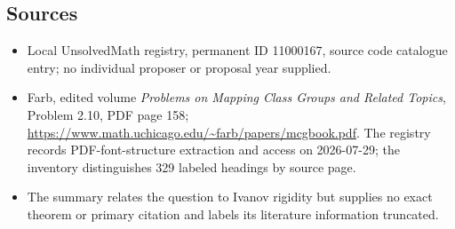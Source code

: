 \documentclass[11pt]{article}
\begin{document}
\subsection{Sources}
\begin{itemize}
\item Local UnsolvedMath registry, permanent ID 11000167, source code catalogue entry; no individual proposer or proposal year supplied.
\item Farb, edited volume \emph{Problems on Mapping Class Groups and Related Topics}, Problem 2.10, PDF page 158; \url{https://www.math.uchicago.edu/~farb/papers/mcgbook.pdf}. The registry records PDF-font-structure extraction and access on 2026-07-29; the inventory distinguishes 329 labeled headings by source page.
\item The summary relates the question to Ivanov rigidity but supplies no exact theorem or primary citation and labels its literature information truncated.
\end{itemize}
\end{document}
